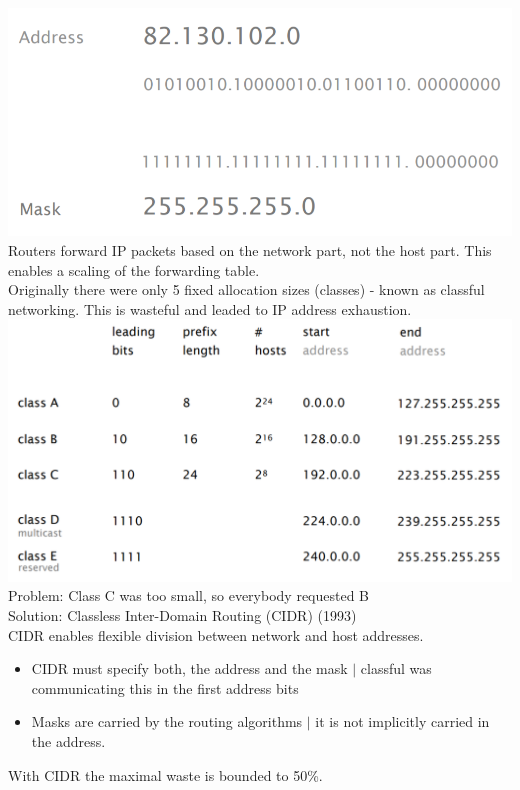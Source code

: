\documentclass[a4paper, fontsize=8pt, landscape, DIV=1]{scrartcl}
\begin{document}
\begin{multicols*}{4}
   		\includegraphics[width=\columnwidth]{images/Network_Layer/mask.png}
   		Routers forward IP packets based on the network part, not the host part. This enables a scaling of the forwarding table. \\
   		Originally there were only 5 fixed allocation sizes (classes) - known as classful networking. This is wasteful and leaded to IP address exhaustion.\\
   		\includegraphics[width=\columnwidth]{images/Network_Layer/classes.png}
   		Problem: Class C was too small, so everybody requested B\\
   		Solution: Classless Inter-Domain Routing (CIDR) (1993)\\
   		CIDR enables flexible division between network and host addresses. 
   		\begin{itemize}[noitemsep]
   			\item CIDR must specify both, the address and the mask $\vert$ classful was communicating this in the first address bits
   			\item Masks are carried by the routing algorithms $\vert$ it is not implicitly carried in the address.  
   		\end{itemize}
   		With CIDR the maximal waste is bounded to 50\%.\\

\end{multicols*}
\end{document}
